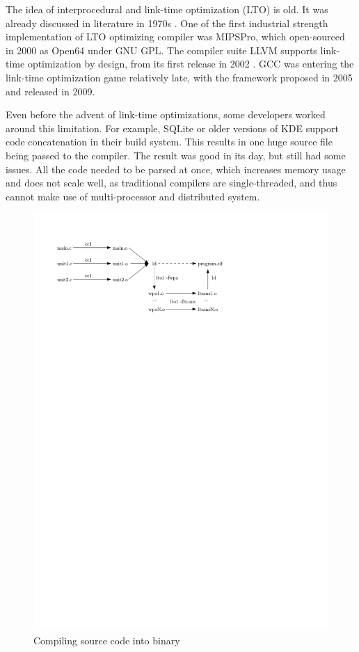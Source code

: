 The idea of interprocedural and link-time optimization (LTO) is old. 
It was already discussed in literature in 1970s \cite{Allen:1974,Allen:1976}.
One of the first industrial strength implementation of LTO optimizing compiler
was MIPSPro, which open-sourced in 2000 as Open64 under GNU GPL. The
compiler suite LLVM supports link-time optimization by design, from its first
release in 2002 \cite{lattner2002llvm}.  GCC was entering the link-time
optimization game relatively late, with the framework proposed in 2005
\cite{gcclto,briggs2007whopr} and released in 2009.

Even before the advent of link-time optimizations, some developers worked around
this limitation. For example, SQLite or older versions of KDE support code
concatenation in their build system. This results in one huge source file being
passed to the compiler. The result was good in its day, but still had some
issues. All the code needed to be parsed at once, which increases memory usage
and does not scale well, as traditional compilers are single-threaded, and thus
cannot make use of multi-processor and distributed system.

\begin{figure}[h!]
	\centering
	\includegraphics{./img/lto-workflow.pdf}
	\caption{Compiling source code into binary}
	\label{figure-lto-workflow}
\end{figure}

